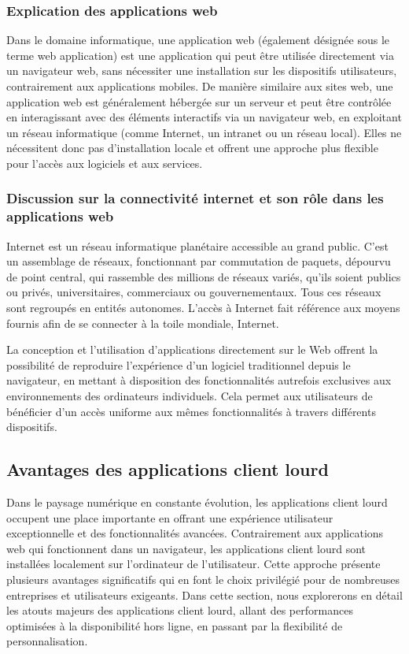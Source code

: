 \documentclass[a4paper, 12pt, french]{article}
\begin{document}
			\subsubsection{Explication des applications web}
				Dans le domaine informatique, une application web (également désignée sous le terme web application) est une application qui peut être utilisée directement via un navigateur web, sans nécessiter une installation sur les dispositifs utilisateurs, contrairement aux applications mobiles. De manière similaire aux sites web, une application web est généralement hébergée sur un serveur et peut être contrôlée en interagissant avec des éléments interactifs via un navigateur web, en exploitant un réseau informatique (comme Internet, un intranet ou un réseau local). Elles ne nécessitent donc pas d'installation locale et offrent une approche plus flexible pour l'accès aux logiciels et aux services.
			
			\subsubsection{Discussion sur la connectivité internet et son rôle dans les applications web}
				Internet est un réseau informatique planétaire accessible au grand public. C'est un assemblage de réseaux, fonctionnant par commutation de paquets, dépourvu de point central, qui rassemble des millions de réseaux variés, qu'ils soient publics ou privés, universitaires, commerciaux ou gouvernementaux. Tous ces réseaux sont regroupés en entités autonomes. L'accès à Internet fait référence aux moyens fournis afin de se connecter à la toile mondiale, Internet.

				La conception et l'utilisation d'applications directement sur le Web offrent la possibilité de reproduire l'expérience d'un logiciel traditionnel depuis le navigateur, en mettant à disposition des fonctionnalités autrefois exclusives aux environnements des ordinateurs individuels. Cela permet aux utilisateurs de bénéficier d'un accès uniforme aux mêmes fonctionnalités à travers différents dispositifs.
		
		\subsection{Avantages des applications client lourd}
			Dans le paysage numérique en constante évolution, les applications client lourd occupent une place importante en offrant une expérience utilisateur exceptionnelle et des fonctionnalités avancées. Contrairement aux applications web qui fonctionnent dans un navigateur, les applications client lourd sont installées localement sur l'ordinateur de l'utilisateur. Cette approche présente plusieurs avantages significatifs qui en font le choix privilégié pour de nombreuses entreprises et utilisateurs exigeants. Dans cette section, nous explorerons en détail les atouts majeurs des applications client lourd, allant des performances optimisées à la disponibilité hors ligne, en passant par la flexibilité de personnalisation.
			
\end{document}
